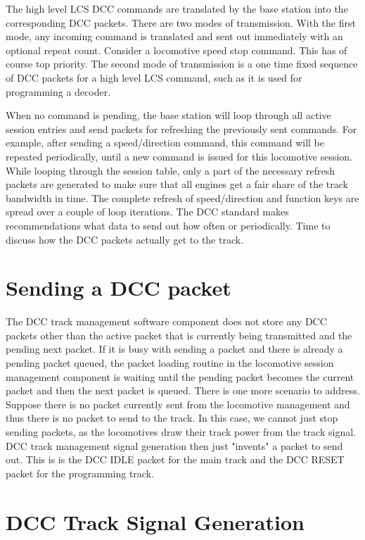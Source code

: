 The high level LCS DCC commands are translated by the base station into the corresponding DCC packets. There are two modes of transmission. With the first mode, any incoming command is translated and sent out immediately with an optional repeat count. Consider a locomotive speed stop command. This has of course top priority. The second mode of transmission is a one time fixed sequence of DCC packets for a high level LCS command, such as it is used for programming a decoder.

When no command is pending, the base station will loop through all active session entries and send packets for refreshing the previously sent commands. For example, after sending a speed/direction command, this command will be repeated periodically, until a new command is issued for this locomotive session. While looping through the session table, only a part of the necessary refresh packets are generated to make sure that all engines get a fair share of the track bandwidth in time. The complete refresh of speed/direction and function keys are spread over a couple of loop iterations. The DCC standard makes recommendations what data to send out how often or periodically. Time to discuss how the DCC packets actually get to the track.

\section{Sending a DCC packet}

The DCC track management software component does not store any DCC packets other than the active packet that is currently being transmitted and the pending next packet. If it is busy with sending a packet and there is already a pending packet queued, the packet loading routine in the locomotive session management component is waiting until the pending packet becomes the current packet and then the next packet is queued. There is one more scenario to address. Suppose there is no packet currently sent from the locomotive management and thus there is no packet to send to the track. In this case, we cannot just stop sending packets, as the locomotives draw their track power from the track signal. DCC track management signal generation then just "invents" a packet to send out. This is is the DCC IDLE packet for the main track and the DCC RESET packet for the programming track.

\section{DCC Track Signal Generation}


